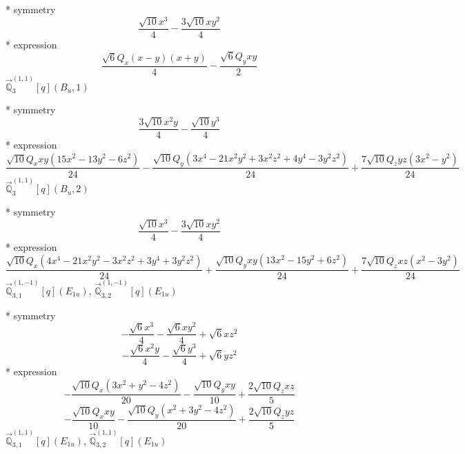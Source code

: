 \documentclass[fleqn,8pt]{jsarticle}
\begin{document}
\noindent\quad ** symmetry
\begin{dmath*}
\frac{\sqrt{10} x^{3}}{4} - \frac{3 \sqrt{10} x y^{2}}{4}
\end{dmath*}
\noindent\quad ** expression
\begin{dmath*}
\frac{\sqrt{6} Q_{x} \left(x - y\right) \left(x + y\right)}{4} - \frac{\sqrt{6} Q_{y} x y}{2}
\end{dmath*}
\noindent\quad $\vec{\mathbb{Q}}_{3}^{(1,1)}[q](B_{u},1)$

\noindent\quad ** symmetry
\begin{dmath*}
\frac{3 \sqrt{10} x^{2} y}{4} - \frac{\sqrt{10} y^{3}}{4}
\end{dmath*}
\noindent\quad ** expression
\begin{dmath*}
\frac{\sqrt{10} Q_{x} x y \left(15 x^{2} - 13 y^{2} - 6 z^{2}\right)}{24} - \frac{\sqrt{10} Q_{y} \left(3 x^{4} - 21 x^{2} y^{2} + 3 x^{2} z^{2} + 4 y^{4} - 3 y^{2} z^{2}\right)}{24} + \frac{7 \sqrt{10} Q_{z} y z \left(3 x^{2} - y^{2}\right)}{24}
\end{dmath*}
\noindent\quad $\vec{\mathbb{Q}}_{3}^{(1,1)}[q](B_{u},2)$

\noindent\quad ** symmetry
\begin{dmath*}
\frac{\sqrt{10} x^{3}}{4} - \frac{3 \sqrt{10} x y^{2}}{4}
\end{dmath*}
\noindent\quad ** expression
\begin{dmath*}
\frac{\sqrt{10} Q_{x} \left(4 x^{4} - 21 x^{2} y^{2} - 3 x^{2} z^{2} + 3 y^{4} + 3 y^{2} z^{2}\right)}{24} + \frac{\sqrt{10} Q_{y} x y \left(13 x^{2} - 15 y^{2} + 6 z^{2}\right)}{24} + \frac{7 \sqrt{10} Q_{z} x z \left(x^{2} - 3 y^{2}\right)}{24}
\end{dmath*}
\noindent\quad $\vec{\mathbb{Q}}_{3,1}^{(1,-1)}[q](E_{1u})$, $\vec{\mathbb{Q}}_{3,2}^{(1,-1)}[q](E_{1u})$

\noindent\quad ** symmetry
\begin{dmath*}
- \frac{\sqrt{6} x^{3}}{4} - \frac{\sqrt{6} x y^{2}}{4} + \sqrt{6} x z^{2}
\end{dmath*}
\begin{dmath*}
- \frac{\sqrt{6} x^{2} y}{4} - \frac{\sqrt{6} y^{3}}{4} + \sqrt{6} y z^{2}
\end{dmath*}
\noindent\quad ** expression
\begin{dmath*}
- \frac{\sqrt{10} Q_{x} \left(3 x^{2} + y^{2} - 4 z^{2}\right)}{20} - \frac{\sqrt{10} Q_{y} x y}{10} + \frac{2 \sqrt{10} Q_{z} x z}{5}
\end{dmath*}
\begin{dmath*}
- \frac{\sqrt{10} Q_{x} x y}{10} - \frac{\sqrt{10} Q_{y} \left(x^{2} + 3 y^{2} - 4 z^{2}\right)}{20} + \frac{2 \sqrt{10} Q_{z} y z}{5}
\end{dmath*}
\noindent\quad $\vec{\mathbb{Q}}_{3,1}^{(1,1)}[q](E_{1u})$, $\vec{\mathbb{Q}}_{3,2}^{(1,1)}[q](E_{1u})$
\end{document}
